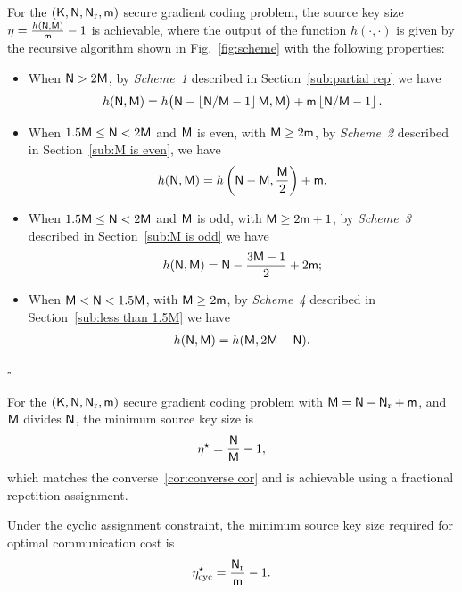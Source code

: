 \documentclass[conference,letterpaper]{IEEEtran}
\begin{document}
\begin{thm}
\label{thm:main achievable scheme}
For the $({\sf K},{\sf N},{\sf N}_{\rm r}, {\sf m})$ secure gradient coding problem, the source key size  $\eta=  \frac{ h({\sf N},{\sf M})}{{\sf m}}-1$ is achievable, where the output of the function \( h(\cdot, \cdot) \) is given by the recursive algorithm shown in Fig.~\ref{fig:scheme} with the following properties:
 \begin{itemize}

 \item When  ${\sf N} > 2{\sf M}$,  by {\it Scheme~1} described in Section~\ref{sub:partial rep} we have  
\begin{align}
h({\sf N},{\sf M})=h\big({\sf N}-\left\lfloor {\sf N}/{\sf M}-1\right\rfloor {\sf M},{\sf M}\big)+ {\sf m}\left\lfloor {\sf N}/{\sf M} -1\right\rfloor  . \label{eq:from partial rep}
\end{align} 
\item When $1.5 {\sf M} \leq {\sf N} < 2 {\sf M}$ and ${\sf M}$ is even, with ${\sf M} \geq 2{\sf m}$,
by {\it Scheme~2} described in Section~\ref{sub:M is even}, we have  
\begin{align}
 h({\sf N}, {\sf M}) = h\left({\sf N} - {\sf M}, \frac{{\sf M}}{2}\right) + {\sf m}. \label{eq:M is even}
\end{align}

 \item When $1.5 {\sf M} \leq  {\sf N} < 2 {\sf M}$ and ${\sf M}$ is odd, with ${\sf M} \geq 2{\sf m}+1$, by  {\it Scheme~3} described in Section~\ref{sub:M is odd} we have  
 \begin{align}
 h({\sf N},{\sf M})=   {\sf N}-\frac{3{\sf M}-1}{2}+2 {\sf m}; \label{eq:M is odd}
 \end{align}
 \item When ${\sf M}< {\sf N} <  1.5 {\sf M}$, with ${\sf M} \geq 2{\sf m}$, by  {\it Scheme~4} described in Section~\ref{sub:less than 1.5M}  we have  
\begin{align}
h({\sf N},{\sf M})=h({\sf M},2{\sf M}-{\sf N}). \label{eq:less than 1.5M}
\end{align} 
  \end{itemize}
    \hfill $\square$ 
 \end{thm} 

 
\begin{rem}
\label{rem:extreme cases}
\em

For the $({\sf K},{\sf N},{\sf N}_{\rm r}, {\sf m})$ secure gradient coding problem with  ${\sf M}= {\sf N} - {\sf N}_{\rm r} + {\sf m}$, and ${\sf M}$ divides ${\sf N}$, the minimum source key size is
\begin{align}
    \eta^{\star} = \frac{{\sf N}}{{\sf M}} - 1, \label{eq:gradient eta rho rep}
\end{align}
which matches the converse~\eqref{cor:converse cor} and is achievable using a fractional repetition assignment.

Under the cyclic assignment constraint, the minimum source key size required for optimal communication cost is
\begin{align}
    \eta^{\star}_{\text{cyc}} = \frac{{\sf N}_{\rm r}}{{\sf m}} - 1. \label{eq:gradient eta cyc}
\end{align}


\end{rem}
\end{document}
